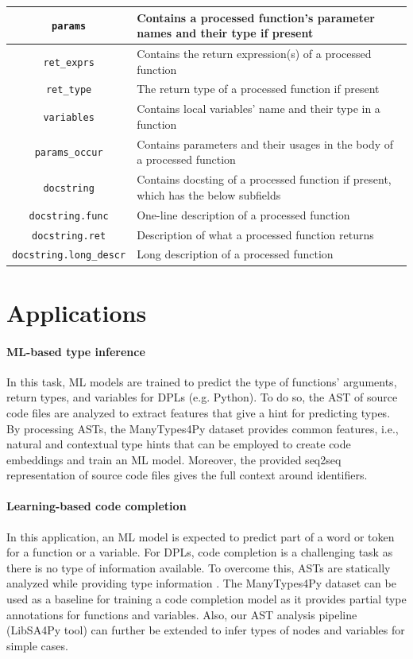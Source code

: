 \documentclass[10pt, conference]{IEEEtran}
\begin{document}
\begin{table}[!t]
\begin{tabular}{c l}
		\midrule
		\texttt{params} & Contains a processed function's parameter names and their type if present \\
		\midrule
		\texttt{ret\_exprs} & Contains the return expression(s) of a processed function \\
		\midrule
		\texttt{ret\_type} & The return type of a processed function if present \\
		\midrule
		\texttt{variables} & Contains local variables' name and their type in a function \\
		\midrule
		\texttt{params\_occur} & Contains parameters and their usages in the body of a processed function \\
		\midrule
		\texttt{docstring} & Contains docsting of a processed function if present, which has the below subfields \\
		\midrule
		\texttt{docstring.func} & One-line description of a processed function \\
		\midrule
		\texttt{docstring.ret} & Description of what a processed function returns \\
		\midrule
		\texttt{docstring.long\_descr} & Long description of a processed function \\
		\bottomrule
	\end{tabular}
\end{table}

\section{Applications}
\paragraph{\textbf{ML-based type inference}} In this task, ML models are trained to predict the type of functions' arguments, return types, and variables for DPLs (e.g. Python). To do so, the AST of source code files are analyzed to extract features that give a hint for predicting types. By processing ASTs, the ManyTypes4Py dataset provides common features, i.e., natural and contextual type hints that can be employed to create code embeddings and train an ML model. Moreover, the provided seq2seq representation of source code files gives the full context around identifiers.

\paragraph{\textbf{Learning-based code completion}} In this application, an ML model is expected to predict part of a word or token for a function or a variable. For DPLs, code completion is a challenging task as there is no type of information available. To overcome this, ASTs are statically analyzed while providing type information \cite{svyatkovskiy2019pythia}. The ManyTypes4Py dataset can be used as a baseline for training a code completion model as it provides partial type annotations for functions and variables. Also, our AST analysis pipeline (LibSA4Py tool) can further be extended to infer types of nodes and variables for simple cases.
\end{document}
